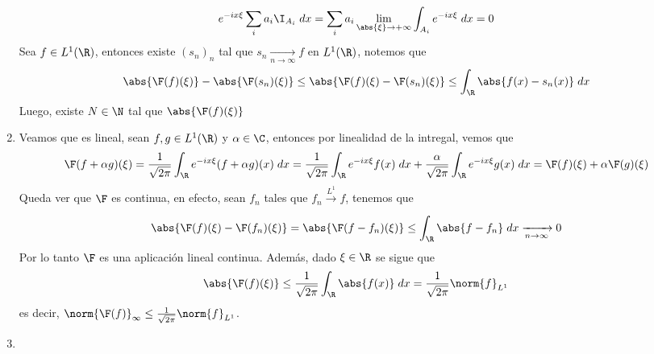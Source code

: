 \documentclass{article}
\begin{document}
\begin{enumerate}
\begin{equation*}
        e^{-ix\xi}\sum_{i}a_{i}\I_{A_{i}}\hspace{1mm}dx=\sum_{i}a_{i}
        \lim\limits_{\abs{\xi}\to+\infty}\int_{A_{i}}e^{-ix\xi}\hspace{1mm}dx=0
    \end{equation*}
    Sea $f\in L^{1}(\R)$, entonces existe $(s_{n})_{n}$ tal que $s_{n}\xrightarrow[n\to\infty]{}f$
    en $L^{1}(\R)$, notemos que
    \begin{equation*}
        \abs{\F(f)(\xi)}-\abs{\F(s_{n})(\xi)}\leq\abs{\F(f)(\xi)-\F(s_{n})(\xi)}
        \leq\int_{\R}\abs{f(x)-s_{n}(x)}\hspace{1mm}dx
    \end{equation*}
    Luego, existe $N\in\N$ tal que $\abs{\F(f)(\xi)}$
    
    \item Veamos que es lineal, sean $f,g\in L^{1}(\R)$ y $\alpha\in\C$, entonces por linealidad
    de la intregal, vemos que
    \begin{equation*}
        \F(f+\alpha g)(\xi)=\frac{1}{\sqrt{2\pi}}\int_{\R}e^{-ix\xi}(f+\alpha g)(x)\hspace{1mm}dx
        =\frac{1}{\sqrt{2\pi}}\int_{\R}e^{-ix\xi}f(x)\hspace{1mm}dx+\frac{\alpha}{\sqrt{2\pi}}\int_{\R}e^{-ix\xi}g(x)\hspace{1mm}dx
        =\F(f)(\xi)+\alpha\F(g)(\xi)
    \end{equation*}
    Queda ver que $\F$ es continua, en efecto, sean $f_{n}$ tales que $f_{n}\xrightarrow[]{L^{1}} 
    f$, tenemos que
    \begin{equation*}
        \abs{\F(f)(\xi)-\F(f_{n})(\xi)}=\abs{\F(f-f_{n})(\xi)}
        \leq\int_{\R}\abs{f-f_{n}}\hspace{1mm}dx\xrightarrow[n\to\infty]{}0
    \end{equation*}
    Por lo tanto $\F$ es una aplicación lineal continua. Además, dado $\xi\in\R$ se sigue que
    \begin{equation*}
        \abs{\F(f)(\xi)}\leq\frac{1}{\sqrt{2\pi}}\int_{\R}\abs{f(x)}\hspace{1mm}dx=\frac{1}{\sqrt{2\pi}}\norm{f}_{L^{1}}
    \end{equation*}
    es decir, $\norm{\F(f)}_{\infty}\leq\frac{1}{\sqrt{2\pi}}\norm{f}_{L^{1}}$.
    
    \item 
\end{enumerate}
\end{document}

